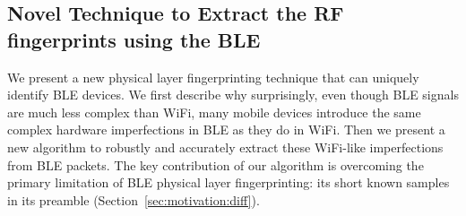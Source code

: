 




\subsection{Novel Technique to Extract the RF fingerprints using the BLE}

We present a new physical layer fingerprinting technique that
can uniquely identify BLE devices.
%
We first describe why surprisingly, even though BLE signals are much less
complex than WiFi, many mobile devices introduce the  same complex hardware
imperfections in BLE as they do in WiFi.
%
Then we present a new algorithm to robustly and accurately extract these
WiFi-like imperfections from BLE packets.
%
The key contribution of our algorithm is overcoming the primary limitation of
BLE physical layer fingerprinting: its short known samples in its preamble
(Section~\ref{sec:motivation:diff}).

